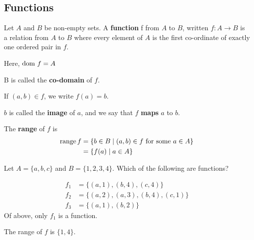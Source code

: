 \documentclass{article}
\begin{document}
  \subsection{Functions}
  \begin{definition}
    Let $A$ and $B$ be non-empty sets. A \textbf{function} f from $A$ to $B$, written $f: A\to B$ is a relation from $A$ to $B$ where every element of $A$ is the first co-ordinate of exactly one ordered pair in $f$.
  \end{definition}
  \begin{definition}
    Here, $\text{dom }{f} = A$
  \end{definition}
  \begin{definition}
    B is called the \textbf{co-domain} of $f$.
  \end{definition}
  \begin{definition}
    If $(a, b) \in f$, we write $f(a) = b$.
  \end{definition}
  \begin{definition}
    $b$ is called the \textbf{image} of $a$, and we say that $f$ \textbf{maps} $a$ to $b$.
  \end{definition}
  \begin{definition}
    The \textbf{range} of $f$ is
    \begin{align*}
      \operatorname{\text{range}}{f} &= \{b \in B \mid (a, b) \in f \text{ for some }a \in A\}\\
      &= \{f(a) \mid a \in A\}
    \end{align*}
  \end{definition}
  \begin{example}
    Let $A = \{a, b, c\}$ and $B = \{1, 2, 3, 4\}$.
    Which of the following are functions?

    \begin{align*}
      f_1 &= \{(a, 1), (b, 4), (c, 4)\}\\
      f_2 &= \{(a, 2), (a, 3), (b, 4), (c, 1)\}\\
      f_3 &= \{(a, 1), (b, 2)\}
    \end{align*}
    Of above, only $f_1$ is a function.

    The range of $f$ is $\{1, 4\}$.
  \end{example}
\end{document}
